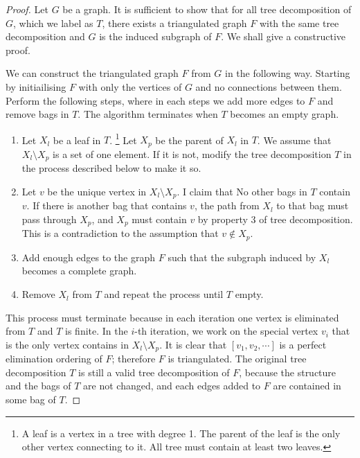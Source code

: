 \begin{proof}
	Let $G$ be a graph. It is sufficient to show that for all tree decomposition of $G$, which we label as $T$, there exists a triangulated graph $F$ with the same tree decomposition and $G$ is the induced subgraph of $F$.
	We shall give a constructive proof.

	We can construct the triangulated graph $F$ from $G$ in the following way.
  Starting by initiailising $F$ with only the vertices of $G$ and no connections between them.
  Perform the following steps, where in each steps we add more edges to $F$ and remove bags in $T$.
  The algorithm terminates when $T$ becomes an empty graph.
  
    \begin{enumerate}
    	\item Let $X_l$ be a leaf in $T$. 
        \footnote{A leaf is a vertex in a tree with degree 1. The parent of the leaf is the only other vertex connecting to it. All tree must contain at least two leaves.} 
        Let $X_p$ be the parent of $X_l$ in $T$.
		   	We assume that $X_l \setminus X_p$ is a set of one element. If it is not, modify the tree decomposition $T$ in the process described below to make it so. 
		\item Let $v$ be the unique vertex in $X_l \setminus X_p$. I claim that No other bags in $T$ contain $v$. If there is another bag that contains $v$, the path from $X_l$ to that bag must pass through $X_p$, and $X_p$ must contain $v$ by property 3 of tree decomposition. This is a contradiction to the assumption that $v \notin X_p$.
		\item Add enough edges to the graph $F$ such that the subgraph induced by $X_l$ becomes a complete graph.
		\item Remove $X_l$ from $T$ and repeat the process until $T$ empty. 
    \end{enumerate}

  This process must terminate because in each iteration one vertex is eliminated from $T$ and $T$ is finite.
  In the $i$-th iteration, we work on the special vertex $v_i$ that is the only vertex contains in $X_l \setminus X_p$. 
  It is clear that $[v_1, v_2, \cdots]$ is a perfect elimination ordering of $F$; therefore $F$ is triangulated.
	The original tree decomposition $T$ is still a valid tree decomposition of $F$, because the structure and the bags of $T$ are not changed, and each edges added to $F$ are contained in some bag of $T$.


\end{proof}
